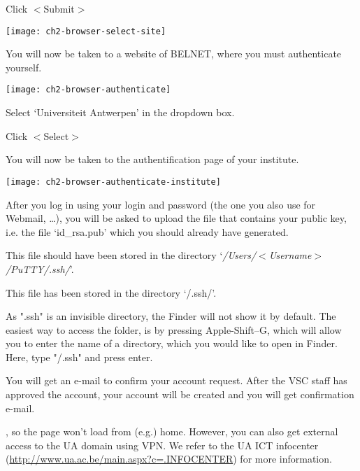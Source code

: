 Click $<$Submit$>$

\texttt{[image: ch2-browser-select-site]}

\ifantwerpen
  You will now be taken to a website of BELNET, where you must authenticate yourself.

  \texttt{[image: ch2-browser-authenticate]}

  Select `Universiteit Antwerpen' in the dropdown box.

  Click $<$Select$>$
\fi

You will now be taken to the authentification page of your institute.

\ifantwerpen
\texttt{[image: ch2-browser-authenticate-institute]}
\fi

After you log in using your \university login and password (the one you also
use for Webmail, \ldots ), you will be asked to upload the file that contains
your public key, i.e. the file `id\_rsa.pub' which you should already have
generated.

\ifwindows

  This file should have been stored in the directory
  `\emph{/Users/$<$Username$>$/PuTTY/.ssh/}'.

\fi



\ifmac

  This file has been stored in the directory `\tilde/.ssh/'.

   As ".ssh" is an invisible directory, the Finder will
  not show it by default. The easiest way to access the folder, is by pressing
  Apple-Shift--G, which will allow you to enter the name of a directory, which
  you would like to open in Finder. Here, type "\tilde/.ssh" and press enter.

\fi

You will get an e-mail to confirm your account request. After the VSC staff has
approved the account, your account will be created and you will get
confirmation e-mail.

\ifantwerpen
{}, so the page won't load from (e.g.) home. However, you can also get
external access to the UA domain using VPN. We refer to the UA ICT infocenter
(\url{http://www.ua.ac.be/main.aspx?c=.INFOCENTER}) for more information.

